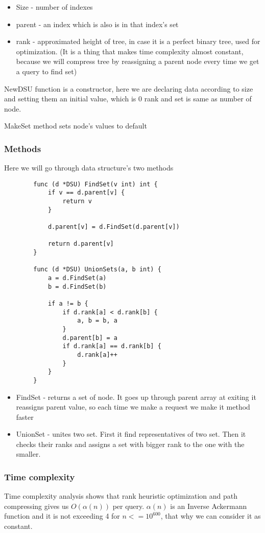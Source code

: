 		
		\begin{itemize}
			\item Size - number of indexes
			\item parent - an index which is also is in that index's set
			\item rank - approximated height of tree, in case it is a perfect binary tree, used for optimization. (It is a thing that makes time complexity almost constant, because we will compress tree by reassigning a parent node every time we get a query to find set)
		\end{itemize}
		
		NewDSU function is a constructor, here we are declaring data according to size and setting them an initial value, which is 0 rank and set is same as number of node.
		
		MakeSet method sets node's values to default
		
		\subsubsection{Methods}
		Here we will go through data structure's two methods
		\begin{lstlisting}
		func (d *DSU) FindSet(v int) int {
			if v == d.parent[v] {
				return v
			}

			d.parent[v] = d.FindSet(d.parent[v])

			return d.parent[v]
		}

		func (d *DSU) UnionSets(a, b int) {
			a = d.FindSet(a)
			b = d.FindSet(b)

			if a != b {
				if d.rank[a] < d.rank[b] {
					a, b = b, a
				}
				d.parent[b] = a
				if d.rank[a] == d.rank[b] {
					d.rank[a]++
				}
			}
		}
		\end{lstlisting}
		\begin{itemize}
			\item FindSet - returns a set of node. It goes up through parent array at exiting it reassigns parent value, so each time we make a request we make it method faster
			\item UnionSet - unites two set. First it find representatives of two set. Then it checks their ranks and assigns a set with bigger rank to the one with the smaller. 
		\end{itemize}
		
		\subsubsection{Time complexity}
		Time complexity analysis shows that rank heuristic optimization and path compressing gives us $O(\alpha{}(n))$ per query. $\alpha(n)$ is an Inverse Ackermann function and it is not exceeding 4 for $n<=10^{600}$, that why we can consider it as constant.
		
